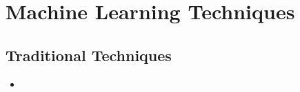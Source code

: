 \section{Machine Learning Techniques}
\label{sec:ml-techniques}
\subsection{Traditional Techniques}
\label{subsec:concepts-traditional-techniques}
\begin{frame}{\insertsubsection}
	\begin{itemize}
        \item 
    \end{itemize}
\end{frame}
%
%
